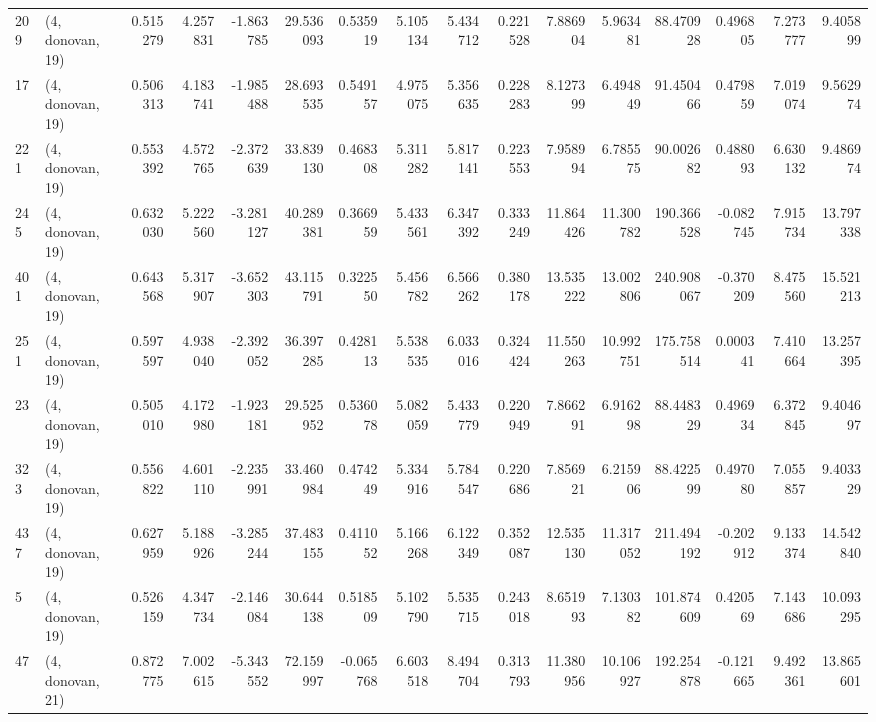 \begin{tabular}{llrrrrrrrrrrrrrr}
209 &  (4, donovan, 19) &   0.515279 &   4.257831 &  -1.863785 &    29.536093 &   0.535919 &   5.105134 &   5.434712 &  0.221528 &   7.886904 &   5.963481 &    88.470928 &  0.496805 &   7.273777 &   9.405899 \\
17  &  (4, donovan, 19) &   0.506313 &   4.183741 &  -1.985488 &    28.693535 &   0.549157 &   4.975075 &   5.356635 &  0.228283 &   8.127399 &   6.494849 &    91.450466 &  0.479859 &   7.019074 &   9.562974 \\
221 &  (4, donovan, 19) &   0.553392 &   4.572765 &  -2.372639 &    33.839130 &   0.468308 &   5.311282 &   5.817141 &  0.223553 &   7.958994 &   6.785575 &    90.002682 &  0.488093 &   6.630132 &   9.486974 \\
245 &  (4, donovan, 19) &   0.632030 &   5.222560 &  -3.281127 &    40.289381 &   0.366959 &   5.433561 &   6.347392 &  0.333249 &  11.864426 &  11.300782 &   190.366528 & -0.082745 &   7.915734 &  13.797338 \\
401 &  (4, donovan, 19) &   0.643568 &   5.317907 &  -3.652303 &    43.115791 &   0.322550 &   5.456782 &   6.566262 &  0.380178 &  13.535222 &  13.002806 &   240.908067 & -0.370209 &   8.475560 &  15.521213 \\
251 &  (4, donovan, 19) &   0.597597 &   4.938040 &  -2.392052 &    36.397285 &   0.428113 &   5.538535 &   6.033016 &  0.324424 &  11.550263 &  10.992751 &   175.758514 &  0.000341 &   7.410664 &  13.257395 \\
23  &  (4, donovan, 19) &   0.505010 &   4.172980 &  -1.923181 &    29.525952 &   0.536078 &   5.082059 &   5.433779 &  0.220949 &   7.866291 &   6.916298 &    88.448329 &  0.496934 &   6.372845 &   9.404697 \\
323 &  (4, donovan, 19) &   0.556822 &   4.601110 &  -2.235991 &    33.460984 &   0.474249 &   5.334916 &   5.784547 &  0.220686 &   7.856921 &   6.215906 &    88.422599 &  0.497080 &   7.055857 &   9.403329 \\
437 &  (4, donovan, 19) &   0.627959 &   5.188926 &  -3.285244 &    37.483155 &   0.411052 &   5.166268 &   6.122349 &  0.352087 &  12.535130 &  11.317052 &   211.494192 & -0.202912 &   9.133374 &  14.542840 \\
5   &  (4, donovan, 19) &   0.526159 &   4.347734 &  -2.146084 &    30.644138 &   0.518509 &   5.102790 &   5.535715 &  0.243018 &   8.651993 &   7.130382 &   101.874609 &  0.420569 &   7.143686 &  10.093295 \\
47  &  (4, donovan, 21) &   0.872775 &   7.002615 &  -5.343552 &    72.159997 &  -0.065768 &   6.603518 &   8.494704 &  0.313793 &  11.380956 &  10.106927 &   192.254878 & -0.121665 &   9.492361 &  13.865601 \\

\end{tabular}
